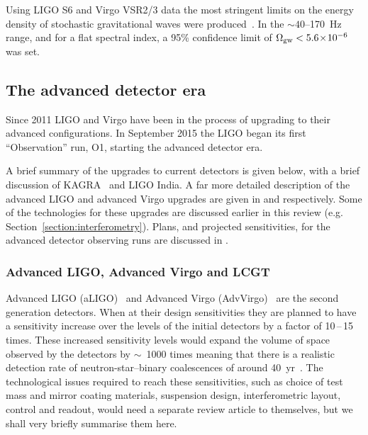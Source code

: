 Using LIGO S6 and Virgo VSR2/3 data the most stringent limits on the energy density
of stochastic gravitational waves were produced~\cite{2014PhRvL.113w1101A}. In the $\sim 40$--170~Hz
range, and for a flat spectral index, a 95\% confidence limit of $\Omega_{\rm gw} < 5.6\!\times\!10^{-6}$
was set.

\subsection{The advanced detector era}


Since 2011 LIGO and Virgo have been in the process of upgrading to their advanced configurations.
In September 2015 the LIGO began its first ``Observation'' run, O1, starting the advanced detector era.

A brief summary of the upgrades to current detectors is given below, with a brief discussion of KAGRA~\cite{2013PhRvD..88d3007A} and LIGO India. A far more detailed description of the advanced LIGO 
and advanced Virgo
upgrades are given in \cite{2015CQGra..32g4001L} and \cite{2015CQGra..32b4001A} respectively. Some of the technologies for these upgrades
are discussed earlier in this review (e.g.\, Section~\ref{section:interferometry}). Plans, and projected sensitivities, for the
advanced detector observing runs are discussed in \cite{lrr-2016-1}.


\subsubsection{Advanced LIGO, Advanced Virgo and LCGT}
\label{subsection:aligo} 

Advanced LIGO (aLIGO)~\cite{2015CQGra..32g4001L, Harry:2010, AdvLIGO, AdvLIGOweb} and Advanced Virgo
(AdvVirgo)~\cite{2015CQGra..32b4001A, AdvVirgoDesign, AdvVirgoweb} are the second generation
detectors. When at their design sensitivities they are planned to have a sensitivity increase over the levels of
the initial detectors by a factor of 10\,--\,15 times. These increased sensitivity
levels would expand the volume of space observed by the detectors by $\sim$~1000
times meaning that there is a realistic detection rate of neutron-star--binary
coalescences of around 40~yr~\cite{Abadie:2010e, Kopparapu:2008}.
The technological issues required to reach these sensitivities, such as choice
of test mass and mirror coating materials, suspension design, interferometric
layout, control and readout, would need a separate review article to themselves,
but we shall very briefly summarise them here.

